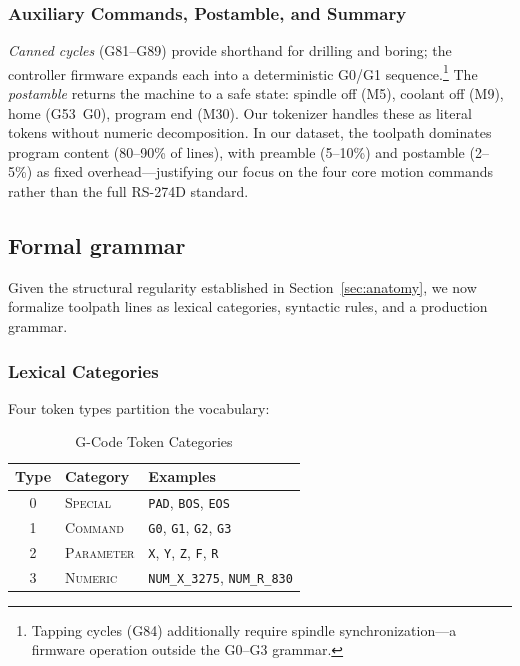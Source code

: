 \documentclass[11pt]{article}
\begin{document}
\subsubsection{Auxiliary Commands, Postamble, and Summary}

\emph{Canned cycles} (G81--G89) provide shorthand for drilling and boring; the controller firmware expands each into a deterministic G0/G1 sequence.\footnote{Tapping cycles (G84) additionally require spindle synchronization---a firmware operation outside the G0--G3 grammar.} The \emph{postamble} returns the machine to a safe state: spindle off (M5), coolant off (M9), home (G53~G0), program end (M30). Our tokenizer handles these as literal tokens without numeric decomposition. In our dataset, the toolpath dominates program content (80--90\% of lines), with preamble (5--10\%) and postamble (2--5\%) as fixed overhead---justifying our focus on the four core motion commands rather than the full RS-274D standard.

\subsection{Formal grammar}
\label{sec:grammar}

Given the structural regularity established in Section~\ref{sec:anatomy}, we now formalize toolpath lines as lexical categories, syntactic rules, and a production grammar.

\subsubsection{Lexical Categories}

Four token types partition the vocabulary:

\begin{table}[htbp]
\centering
\caption{G-Code Token Categories}
\label{tab:token_categories}
\begin{tabular}{@{}clp{3.2cm}@{}}
\toprule
\textbf{Type} & \textbf{Category} & \textbf{Examples} \\
\midrule
0 & \textsc{Special}   & \texttt{PAD}, \texttt{BOS}, \texttt{EOS} \\
1 & \textsc{Command}   & \texttt{G0}, \texttt{G1}, \texttt{G2}, \texttt{G3} \\
2 & \textsc{Parameter} & \texttt{X}, \texttt{Y}, \texttt{Z}, \texttt{F}, \texttt{R} \\
3 & \textsc{Numeric}   & \texttt{NUM\_X\_3275}, \texttt{NUM\_R\_830} \\
\bottomrule
\end{tabular}
\end{table}
\end{document}
